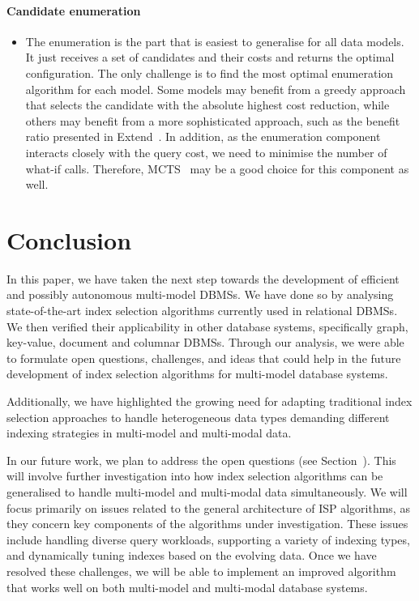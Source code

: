 \paragraph{Candidate enumeration}
\begin{itemize}
    \item The enumeration is the part that is easiest to generalise for all data models. It just receives a set of candidates and their costs and returns the optimal configuration. The only challenge is to find the most optimal enumeration algorithm for each model. Some models may benefit from a greedy approach that selects the candidate with the absolute highest cost reduction, while others may benefit from a more sophisticated approach, such as the benefit ratio presented in Extend~\citep{Extend}. In addition, as the enumeration component interacts closely with the query cost, we need to minimise the number of what-if calls. Therefore, MCTS~\citep{MCTS} may be a good choice for this component as well.
\end{itemize}



\section*{Conclusion}
In this paper, we have taken the next step towards the development of efficient and possibly autonomous multi-model DBMSs. %
We have done so by analysing state-of-the-art index selection algorithms currently used in relational DBMSs. We then verified their applicability in other database systems, specifically graph, key-value, document and columnar DBMSs. Through our analysis, we were able to formulate open questions, challenges, and ideas that could help in the future development of index selection algorithms for multi-model database systems.

Additionally, we have highlighted the growing need for adapting traditional index selection approaches to handle heterogeneous data types demanding different indexing strategies in multi-model and multi-modal data.

In our future work, we plan to address the open questions (see Section~). This will involve further investigation into how index selection algorithms can be generalised to handle multi-model and multi-modal data simultaneously. We will focus primarily on issues related to the general architecture of ISP algorithms, as they concern key components of the algorithms under investigation. These issues include handling diverse query workloads, supporting a variety of indexing types, and dynamically tuning indexes based on the evolving data. Once we have resolved these challenges, we will be able to implement an improved algorithm that works well on both multi-model and multi-modal database systems.


% 

% 

% 
